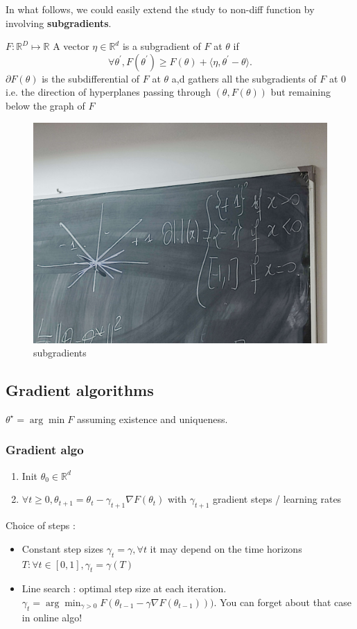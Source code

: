 \begin{note}[]
    In what follows, we could easily extend the study to non-diff function by involving \textbf{subgradients}. 
    
    $ F: \mathbb{R}^D \mapsto \mathbb{R} $ A vector $ \eta  \in \mathbb{R}^d $ is a subgradient of $ F $ at $ \theta  $ if 
    \[
        \forall \theta ^\prime, F(\theta ^\prime ) \geq F(\theta ) + \langle \eta , \theta ^\prime - \theta \rangle
    .\]
    $ \partial F(\theta ) $ is the subdifferential of $ F $ at $ \theta  $ a,d gathers all the subgradients of $ F $ at $ 0 $ i.e. the direction of hyperplanes passing through $ (\theta , F(\theta )) $ but remaining below the graph of $ F $ 

    \begin{figure}[h]
        \centering
        \includegraphics*[width=.5\textwidth]{figs/subgradients.jpg}
        \caption{subgradients}
    \end{figure}

\end{note}


\subsection{Gradient algorithms}
$ \theta ^\star = \arg \min F $ assuming existence and uniqueness. 

\subsubsection{Gradient algo}
\begin{enumerate}
    \item Init $ \theta _0  \in \mathbb{R} ^d $
    \item $ \forall t \geq 0, \theta _{t+1} = \theta _t - \gamma _{t+1} \nabla F(\theta _t) $ with $ \gamma _{t+1} $ gradient steps / learning rates
\end{enumerate}
Choice of steps : 
\begin{itemize}
    \item Constant step sizes $ \gamma _t = \gamma , \forall t $ it may depend on the time horizons $ T: \forall t \in [0, 1], \gamma _t = \gamma (T) $ 
    \item Line search : optimal step size at each iteration. $ \gamma _{t} = \arg \min _{\gamma > 0} F(\theta _{t-1} - \gamma \nabla F(\theta _{t-1}))) $. You can forget about that case in online algo!
\end{itemize}

